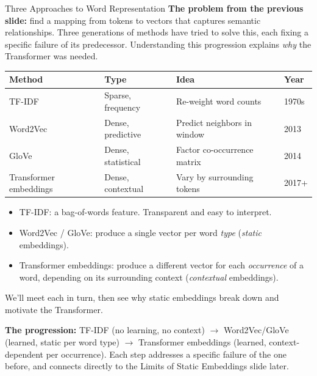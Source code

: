 \begin{frame}{Three Approaches to Word Representation}
\textbf{The problem from the previous slide:} find a mapping from tokens to vectors that captures semantic relationships. Three generations of methods have tried to solve this, each fixing a specific failure of its predecessor. Understanding this progression explains \emph{why} the Transformer was needed.
\medskip
\begin{center}
\renewcommand{\arraystretch}{1.3}
\begin{tabular}{l l l l}
\toprule
\textbf{Method} & \textbf{Type} & \textbf{Idea} & \textbf{Year} \\
\midrule
TF-IDF & Sparse, frequency & Re-weight word counts & 1970s \\
Word2Vec & Dense, predictive & Predict neighbors in window & 2013 \\
GloVe & Dense, statistical & Factor co-occurrence matrix & 2014 \\
Transformer embeddings & Dense, contextual & Vary by surrounding tokens & 2017+ \\
\bottomrule
\end{tabular}
\end{center}

\medskip
\begin{itemize}
\item TF-IDF: a bag-of-words feature. Transparent and easy to interpret.
\item Word2Vec / GloVe: produce a single vector per word \emph{type} (\emph{static} embeddings).
\item Transformer embeddings: produce a different vector for each \emph{occurrence} of a word, depending on its surrounding context (\emph{contextual} embeddings).
\end{itemize}

\medskip
We'll meet each in turn, then see why static embeddings break down and motivate the Transformer.

\smallskip
\textbf{The progression:} TF-IDF (no learning, no context) $\to$ Word2Vec/GloVe (learned, static per word type) $\to$ Transformer embeddings (learned, context-dependent per occurrence). Each step addresses a specific failure of the one before, and connects directly to the Limits of Static Embeddings slide later.
\end{frame}

